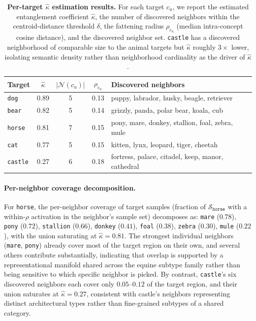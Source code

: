 \begin{table}[ht]
\centering
\small
\setlength{\tabcolsep}{6pt}
\begin{tabular}{lcccl}
\toprule
\textbf{Target} & $\hat\kappa$ & $|\mathcal{N}(c_u)|$ & $\rho_{c_u}$ & \textbf{Discovered neighbors} \\
\midrule
\texttt{dog}    & 0.89 & 5 & 0.13 & puppy, labrador, husky, beagle, retriever \\
\texttt{bear}   & 0.82 & 5 & 0.14 & grizzly, panda, polar bear, koala, cub \\
\texttt{horse}  & 0.81 & 7 & 0.15 & pony, mare, donkey, stallion, foal, zebra, mule \\
\texttt{cat}    & 0.77 & 5 & 0.15 & kitten, lynx, leopard, tiger, cheetah \\
\texttt{castle} & 0.27 & 6 & 0.18 & fortress, palace, citadel, keep, manor, cathedral \\
\bottomrule
\end{tabular}
\caption{
\textbf{Per-target $\hat\kappa$ estimation results.} For each target $c_u$, we report the estimated entanglement coefficient $\hat\kappa$, the number of discovered neighbors within the centroid-distance threshold $\delta$, the fattening radius $\rho_{c_u}$ (median intra-concept cosine distance), and the discovered neighbor set. \texttt{castle} has a discovered neighborhood of comparable size to the animal targets but $\hat\kappa$ roughly $3\times$ lower, isolating semantic density rather than neighborhood cardinality as the driver of $\hat\kappa$. }
\label{tab:kappa_per_target}
\end{table}

\paragraph{Per-neighbor coverage decomposition.}
For \texttt{horse}, the per-neighbor coverage of target samples (fraction of $\mathcal{S}_{\texttt{horse}}$ with a within-$\rho$ activation in the neighbor's sample set) decomposes as: \texttt{mare} ($0.78$), \texttt{pony} ($0.72$), \texttt{stallion} ($0.66$), \texttt{donkey} ($0.41$), \texttt{foal} ($0.38$), \texttt{zebra} ($0.30$), \texttt{mule} ($0.22$), with the union saturating at $\hat\kappa = 0.81$. 
The strongest individual neighbors (\texttt{mare}, \texttt{pony}) already cover most of the target region on their own, and several others contribute substantially, indicating that overlap is supported by a representational manifold shared across the equine subtype family rather than being sensitive to which specific neighbor is picked. By contrast, \texttt{castle}'s six discovered neighbors each cover only $0.05$--$0.12$ of the target region, and their union saturates at $\hat\kappa = 0.27$, consistent with castle's neighbors representing distinct architectural types rather than fine-grained subtypes of a shared category.

